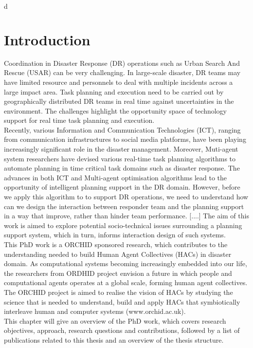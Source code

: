 d\chapter{Introduction}\label{ch:introduction}
Coordination in Disaster Response (DR) operations such as Urban Search And Rescue (USAR) can be very challenging. In large-scale disaster, DR teams may have limited resource and personnels to deal with multiple incidents across a large impact area. Task planning and execution need to be carried out by geographically distributed DR teams in real time against uncertainties in the environment. The challenges highlight the opportunity space of technology support for real time task planning and execution.  \\ 

Recently, various Information and Communication Technologies (ICT), ranging from communication infrastructures to social media platforms, have been playing increasingly significant role in the disaster management.  Moreover, Muti-agent system researchers have devised various real-time task planning algorithms to automate planning in time critical task domains such as disaster response. The advances in both ICT and Multi-agent optimisation algorithms lead to the opportunity of intelligent planning support in the DR domain. However, before we apply this algorithm to to support DR operations, we need to understand how can we design the interaction between responder team and the planning support in a way that improve, rather than hinder team performance. [....] The aim of this work is aimed to explore potential socio-technical issues surrounding a planning support system, which in turn, informs interaction design of such systems. \\

This PhD work is a ORCHID sponsored research, which contributes to the understanding needed to build Human Agent Collectives (HACs) in disaster domain. As computational systems  becoming increasingly embedded into our life, the researchers from ORDHID project envision a future in which people and computational agents operates at a global scale, forming human agent collectives. The ORCHID project is aimed to realise the vision of HACs by studying the science that is needed to understand, build and apply HACs that symbiotically interleave human and computer systems (www.orchid.ac.uk).\\

This chapter will give an overview of the PhD work, which covers research objectives, approach, research questions and contributions, followed by a list of publications related to this thesis and an overview of the thesis structure.\\


